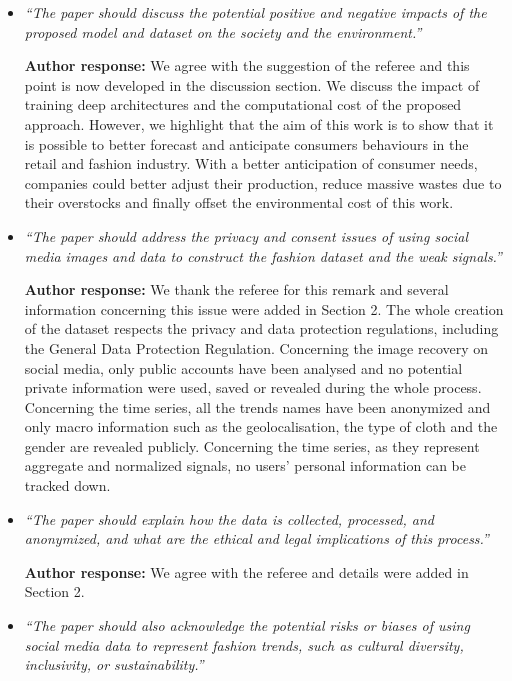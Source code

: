 \documentclass[10pt]{article} %
\begin{document}
\begin{itemize}
	\item {\em ``The paper should discuss the potential positive and negative impacts of the proposed model and dataset on the society and the environment.''} \medskip
	
	\textbf{Author response:} We agree with the suggestion of the referee and this point is now developed in the discussion section. We discuss the impact of training deep architectures and the computational cost of the proposed approach. However, we highlight that the aim of this work is to show that it is possible to better forecast and anticipate consumers behaviours in the retail and fashion industry. With a better anticipation of consumer needs, companies could better adjust their production, reduce massive wastes due to their overstocks and finally offset the environmental cost of this work.  \\
	
	\item {\em ``The paper should address the privacy and consent issues of using social media images and data to construct the fashion dataset and the weak signals.''} \medskip
	
	\textbf{Author response:} We thank the referee for this remark and several information concerning this issue were added in Section 2. The whole creation of the dataset respects the privacy and data protection regulations, including the General Data Protection Regulation. Concerning the image recovery on social media, only public accounts have been analysed and no potential private information were used, saved or revealed during the whole process. Concerning the time series, all the trends names have been anonymized and only macro information such as the geolocalisation, the type of cloth and the gender are revealed publicly. Concerning the time series, as they represent aggregate and normalized signals, no users' personal information can be tracked down.\\
	
	\item {\em ``The paper should explain how the data is collected, processed, and anonymized, and what are the ethical and legal implications of this process.''} \medskip
	
	\textbf{Author response:} We agree with the referee and  details were added  in  Section 2. \\
	
	\item {\em ``The paper should also acknowledge the potential risks or biases of using social media data to represent fashion trends, such as cultural diversity, inclusivity, or sustainability.''} \medskip
	

\end{itemize}
\end{document}
